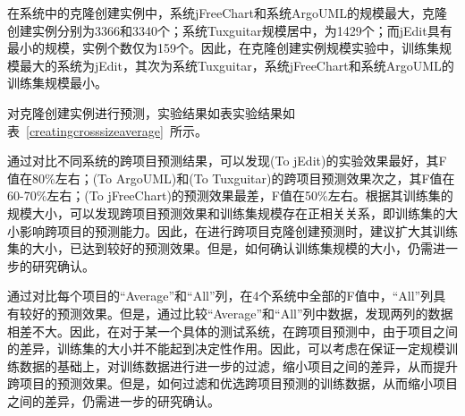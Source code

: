 在系统中的克隆创建实例中，系统jFreeChart和系统ArgoUML的规模最大，克隆创建实例分别为3366和3340个；系统Tuxguitar规模居中，为1429个；而jEdit具有最小的规模，实例个数仅为159个。因此，在克隆创建实例规模实验中，训练集规模最大的系统为jEdit，其次为系统Tuxguitar，系统jFreeChart和系统ArgoUML的训练集规模最小。

对克隆创建实例进行预测，实验结果如表实验结果如表~\ref{creatingcrosssizeaverage}~所示。

通过对比不同系统的跨项目预测结果，可以发现(To jEdit)的实验效果最好，其F值在80\%左右；(To ArgoUML)和(To Tuxguitar)的跨项目预测效果次之，其F值在60-70\%左右；(To jFreeChart)的预测效果最差，F值在50\%左右。根据其训练集的规模大小，可以发现跨项目预测效果和训练集规模存在正相关关系，即训练集的大小影响跨项目的预测能力。因此，在进行跨项目克隆创建预测时，建议扩大其训练集的大小，已达到较好的预测效果。但是，如何确认训练集规模的大小，仍需进一步的研究确认。

通过对比每个项目的“Average”和“All”列，在4个系统中全部的F值中，“All”列具有较好的预测效果。但是，通过比较“Average”和“All”列中数据，发现两列的数据相差不大。因此，在对于某一个具体的测试系统，在跨项目预测中，由于项目之间的差异，训练集的大小并不能起到决定性作用。因此，可以考虑在保证一定规模训练数据的基础上，对训练数据进行进一步的过滤，缩小项目之间的差异，从而提升跨项目的预测效果。但是，如何过滤和优选跨项目预测的训练数据，从而缩小项目之间的差异，仍需进一步的研究确认。

